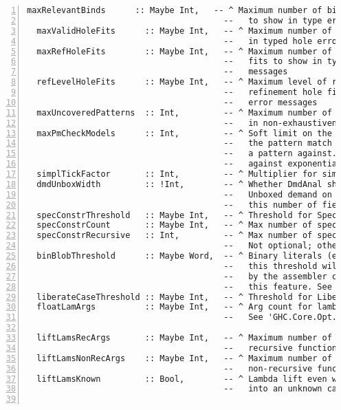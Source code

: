 \documentclass[en]{pracamgr}
\begin{document}
\begin{lstlisting}[numbers=left,stepnumber=1]
  maxRelevantBinds      :: Maybe Int,   -- ^ Maximum number of bindings from the type envt
                                        --   to show in type error messages
  maxValidHoleFits      :: Maybe Int,   -- ^ Maximum number of hole fits to show
                                        --   in typed hole error messages
  maxRefHoleFits        :: Maybe Int,   -- ^ Maximum number of refinement hole
                                        --   fits to show in typed hole error
                                        --   messages
  refLevelHoleFits      :: Maybe Int,   -- ^ Maximum level of refinement for
                                        --   refinement hole fits in typed hole
                                        --   error messages
  maxUncoveredPatterns  :: Int,         -- ^ Maximum number of unmatched patterns to show
                                        --   in non-exhaustiveness warnings
  maxPmCheckModels      :: Int,         -- ^ Soft limit on the number of models
                                        --   the pattern match checker checks
                                        --   a pattern against. A safe guard
                                        --   against exponential blow-up.
  simplTickFactor       :: Int,         -- ^ Multiplier for simplifier ticks
  dmdUnboxWidth         :: !Int,        -- ^ Whether DmdAnal should optimistically put an
                                        --   Unboxed demand on returned products with at most
                                        --   this number of fields
  specConstrThreshold   :: Maybe Int,   -- ^ Threshold for SpecConstr
  specConstrCount       :: Maybe Int,   -- ^ Max number of specialisations for any one function
  specConstrRecursive   :: Int,         -- ^ Max number of specialisations for recursive types
                                        --   Not optional; otherwise ForceSpecConstr can diverge.
  binBlobThreshold      :: Maybe Word,  -- ^ Binary literals (e.g. strings) whose size is above
                                        --   this threshold will be dumped in a binary file
                                        --   by the assembler code generator. 0 and Nothing disables
                                        --   this feature. See 'GHC.StgToCmm.Config'.
  liberateCaseThreshold :: Maybe Int,   -- ^ Threshold for LiberateCase
  floatLamArgs          :: Maybe Int,   -- ^ Arg count for lambda floating
                                        --   See 'GHC.Core.Opt.Monad.FloatOutSwitches'

  liftLamsRecArgs       :: Maybe Int,   -- ^ Maximum number of arguments after lambda lifting a
                                        --   recursive function.
  liftLamsNonRecArgs    :: Maybe Int,   -- ^ Maximum number of arguments after lambda lifting a
                                        --   non-recursive function.
  liftLamsKnown         :: Bool,        -- ^ Lambda lift even when this turns a known call
                                        --   into an unknown call.


\end{lstlisting}
\end{document}
